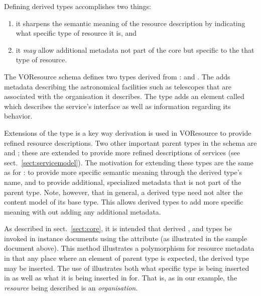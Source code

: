 \documentclass[11pt,a4paper]{ivoa}
\begin{document}
Defining derived  types accomplishes two
things:
\begin{enumerate}
  \item it sharpens the semantic meaning of the resource description by
       indicating what specific type of resource it is, and
  \item it \emph{may} allow additional metadata not part of the core
       but specific to the that type of resource.
\end{enumerate}



The VOResource schema defines two types derived from
:   and
.   The  adds
metadata describing the astronomical facilities such as telescopes
that are associated with the organisation it describes.  The
 type adds an element called
 which describes the service's interface as
well as information regarding its behavior.  



Extensions of the  type is a key way
derivation is used in VOResource to provide refined resource
descriptions.  Two other important parent types in the schema are
 and ; these are
extended to provide more refined descriptions of services (see
sect.~\ref{sect:servicemodel}).  The motivation for extending
these types are the same as for : to provide
more specific semantic meaning through the derived type's name, and to
provide additional, specialized metadata that is not part of the
parent type.  Note, however, that in general, a derived type need not
alter the content model of its base type.  This allows derived types
to add more specific meaning with out adding any additional metadata.



As described in sect.~\ref{sect:core}, it is intended that derived
,  and 
types be invoked in instance documents using the 
attribute (as illustrated in the sample document above).  This method
illustrates a polymorphism for resource metadata in that any place where
an element of parent type is expected, the derived type may be inserted.
The use of  illustrates both what specific type is being
inserted in as well as what it is being inserted in for.  That is, as in
our example, the \emph{resource} being described is an
\emph{organisation}.  
\end{document}
